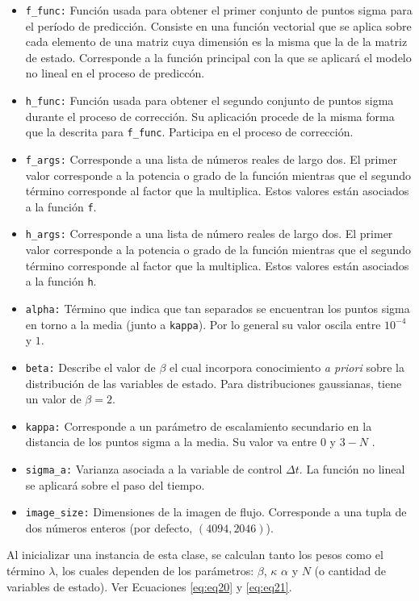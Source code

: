 \begin{itemize}
\item \texttt{f\_func:} Funci\'on usada para obtener el primer conjunto de puntos sigma para el per\'iodo de predicci\'on. Consiste en una funci\'on vectorial que se aplica sobre cada elemento de una matriz cuya dimensi\'on es la misma que la de la matriz de estado. Corresponde a la funci\'on principal con la que se aplicar\'a el modelo no lineal en el proceso de predicc\'on.
\item \texttt{h\_func:} Funci\'on usada para obtener el segundo conjunto de puntos sigma durante el proceso de correcci\'on. Su aplicaci\'on procede de la misma forma que la descrita para \texttt{f\_func}. Participa en el proceso de correcci\'on.
\item \texttt{f\_args:} Corresponde a una lista de n\'umeros reales de largo dos. El primer valor corresponde a la potencia o grado de la funci\'on mientras que el segundo t\'ermino corresponde al factor que la multiplica. Estos valores est\'an asociados a la funci\'on \texttt{f}.
\item \texttt{h\_args:} Corresponde a una lista de n\'umero reales de largo dos. El primer valor corresponde a la potencia o grado de la funci\'on mientras que el segundo t\'ermino corresponde al factor que la multiplica. Estos valores est\'an asociados a la funci\'on \texttt{h}.
\item \texttt{alpha:} T\'ermino que indica que tan separados se encuentran los puntos sigma en torno a la media (junto a \texttt{kappa}). Por lo general su valor oscila entre $10^{-4}$ y $1$. 
\item \texttt{beta:} Describe el valor de $\beta$ el cual incorpora conocimiento \textit{a priori} sobre la distribuci\'on de las variables de estado. Para distribuciones gaussianas, tiene un valor de $\beta=2$. 
\item \texttt{kappa:} Corresponde a un par\'ametro de escalamiento secundario en la distancia de los puntos sigma a la media. Su valor va entre $0$ y $3-N$ \cite{wan}.
\item \texttt{sigma\_a:} Varianza asociada a la variable de control $\Delta t$. La funci\'on no lineal se aplicar\'a sobre el paso del tiempo.
\item \texttt{image\_size:} Dimensiones de la imagen de flujo. Corresponde a una tupla de dos n\'umeros enteros (por defecto, $(4094, 2046)$).
\end{itemize}

Al inicializar una instancia de esta clase, se calculan tanto los pesos como el t\'ermino $\lambda$, los cuales dependen de los par\'ametros: $\beta$, $\kappa$ $\alpha$ y $N$ (o cantidad de variables de estado). Ver Ecuaciones \ref{eq:eq20} y \ref{eq:eq21}.
\bigskip

